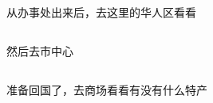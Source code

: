 ﻿\documentclass[hyperref={bookmarks=true},xcolor=pdflatex,svgnames,table,compress]{beamer}
\begin{document}
\subsection{}
\begin{frame}
\end{frame}

\subsection{}
\begin{frame}
\begin{ztebox}
从办事处出来后，去这里的华人区看看
\end{ztebox}
\end{frame}

\subsection{}
\begin{frame}
\end{frame}

\subsection{}
\begin{frame}
\end{frame}

\subsection{}
\begin{frame}
\begin{ztebox}
然后去市中心
\end{ztebox}
\end{frame}

\subsection{}
\begin{frame}
\begin{ztebox}
准备回国了，去商场看看有没有什么特产
\end{ztebox}
\end{frame}

\subsection{}
\begin{frame}
\end{frame}
\end{document}
